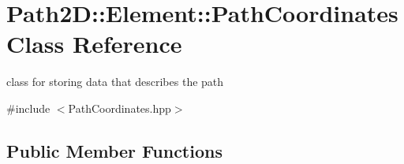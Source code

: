 \hypertarget{class_path2_d_1_1_element_1_1_path_coordinates}{}\section{Path2D\+:\+:Element\+:\+:Path\+Coordinates Class Reference}
\label{class_path2_d_1_1_element_1_1_path_coordinates}


class for storing data that describes the path  




{\ttfamily \#include $<$Path\+Coordinates.\+hpp$>$}

\subsection*{Public Member Functions}
